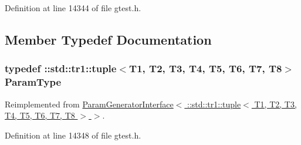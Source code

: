 \-Definition at line 14344 of file gtest.\-h.



\subsection{\-Member \-Typedef \-Documentation}
\hypertarget{classtesting_1_1internal_1_1CartesianProductGenerator8_a1323810362151af79d39617fabdcade1}{
\subsubsection[{\-Param\-Type}]{\setlength{\rightskip}{0pt plus 5cm}typedef \-::{\bf std\-::tr1\-::tuple}$<$\-T1, \-T2, \-T3, \-T4, \-T5, \-T6, \-T7, \-T8$>$ {\bf \-Param\-Type}}}\label{df/dcc/classtesting_1_1internal_1_1CartesianProductGenerator8_a1323810362151af79d39617fabdcade1}


\-Reimplemented from \hyperlink{classtesting_1_1internal_1_1ParamGeneratorInterface_a1c17d95e5946c3f940ece2bd9165fc34}{\-Param\-Generator\-Interface$<$ \-::std\-::tr1\-::tuple$<$ T1, T2, T3, T4, T5, T6, T7, T8 $>$ $>$}.



\-Definition at line 14348 of file gtest.\-h.



